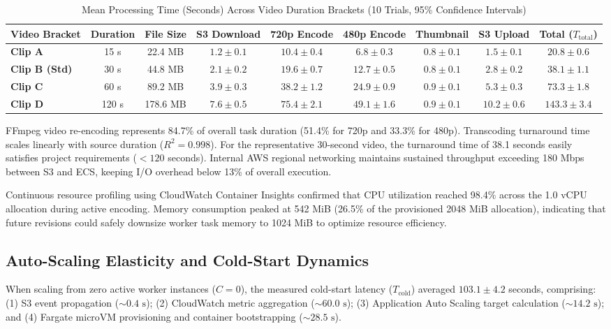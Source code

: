 \documentclass[conference]{IEEEtran}
\begin{document}
\begin{table}[t]
\caption{Mean Processing Time (Seconds) Across Video Duration Brackets (10 Trials, 95\% Confidence Intervals)}
\label{tab:transcoding}
\begin{center}
\begin{tabular}{lcccccccc}
\toprule
\textbf{Video Bracket} & \textbf{Duration} & \textbf{File Size} & \textbf{S3 Download} & \textbf{720p Encode} & \textbf{480p Encode} & \textbf{Thumbnail} & \textbf{S3 Upload} & \textbf{Total ($T_{\text{total}}$)} \\
\midrule
\textbf{Clip A} & 15 s & 22.4 MB & $1.2 \pm 0.1$ & $10.4 \pm 0.4$ & $6.8 \pm 0.3$ & $0.8 \pm 0.1$ & $1.5 \pm 0.1$ & $\mathbf{20.8 \pm 0.6}$ \\
\textbf{Clip B (Std)} & 30 s & 44.8 MB & $2.1 \pm 0.2$ & $19.6 \pm 0.7$ & $12.7 \pm 0.5$ & $0.8 \pm 0.1$ & $2.8 \pm 0.2$ & $\mathbf{38.1 \pm 1.1}$ \\
\textbf{Clip C} & 60 s & 89.2 MB & $3.9 \pm 0.3$ & $38.2 \pm 1.2$ & $24.9 \pm 0.9$ & $0.9 \pm 0.1$ & $5.3 \pm 0.3$ & $\mathbf{73.3 \pm 1.8}$ \\
\textbf{Clip D} & 120 s & 178.6 MB & $7.6 \pm 0.5$ & $75.4 \pm 2.1$ & $49.1 \pm 1.6$ & $0.9 \pm 0.1$ & $10.2 \pm 0.6$ & $\mathbf{143.3 \pm 3.4}$ \\
\bottomrule
\end{tabular}
\end{center}
\end{table}

FFmpeg video re-encoding represents 84.7\% of overall task duration (51.4\% for 720p and 33.3\% for 480p). Transcoding turnaround time scales linearly with source duration ($R^2 = 0.998$). For the representative 30-second video, the turnaround time of 38.1 seconds easily satisfies project requirements ($< 120$ seconds). Internal AWS regional networking maintains sustained throughput exceeding 180 Mbps between S3 and ECS, keeping I/O overhead below 13\% of overall execution.

Continuous resource profiling using CloudWatch Container Insights confirmed that CPU utilization reached 98.4\% across the 1.0 vCPU allocation during active encoding. Memory consumption peaked at 542 MiB (26.5\% of the provisioned 2048 MiB allocation), indicating that future revisions could safely downsize worker task memory to 1024 MiB to optimize resource efficiency.

\subsection{Auto-Scaling Elasticity and Cold-Start Dynamics}
When scaling from zero active worker instances ($C = 0$), the measured cold-start latency ($T_{\text{cold}}$) averaged $103.1 \pm 4.2$ seconds, comprising: (1) S3 event propagation ($\sim 0.4\text{ s}$); (2) CloudWatch metric aggregation ($\sim 60.0\text{ s}$); (3) Application Auto Scaling target calculation ($\sim 14.2\text{ s}$); and (4) Fargate microVM provisioning and container bootstrapping ($\sim 28.5\text{ s}$).
\end{document}
